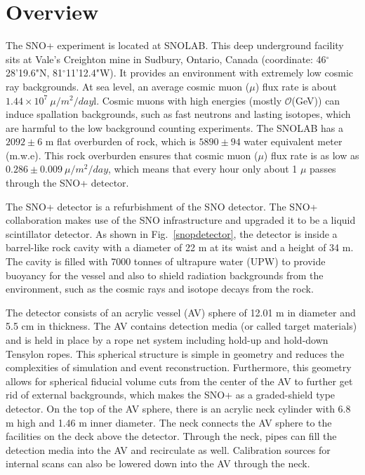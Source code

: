 
\section{Overview}\label{sect:overview}
The SNO+ experiment is located at SNOLAB. This deep underground facility sits at Vale's Creighton mine in Sudbury, Ontario, Canada (coordinate: 46$^\circ$28'19.6"N, 81$^\circ$11'12.4"W). It provides an environment with extremely low cosmic ray backgrounds. At sea level, an average cosmic muon ($\mu$) flux rate is about $1.44\times 10^7~\mu/m^2/day$l\cite{muonflux}. Cosmic muons with high energies (mostly $\mathcal{O}$(GeV)) can induce spallation backgrounds, such as fast neutrons and lasting isotopes, which are harmful to the low background counting experiments\cite{beacom2017physics}. The SNOLAB has a $2092\pm6$ m flat overburden of rock, which is $5890\pm94$ water equivalent meter (m.w.e). This rock overburden ensures that cosmic muon ($\mu$) flux rate is as low as $0.286\pm0.009~\mu/m^2/day$\cite{snop_jinst}, which means that every hour only about 1 $\mu$ passes through the SNO+ detector. 

The SNO+ detector is a refurbishment of the SNO detector. The SNO+ collaboration makes use of the SNO infrastructure and upgraded it to be a liquid scintillator detector. As shown in Fig.~\ref{snopdetector}, the detector is inside a barrel-like rock cavity with a diameter of 22 m at its waist and a height of 34 m. The cavity is filled with 7000 tonnes of ultrapure water (UPW) to provide buoyancy for the vessel and also to shield radiation backgrounds from the environment, such as the cosmic rays and isotope decays from the rock. 

The detector consists of an acrylic vessel (AV) sphere of 12.01 m in diameter and 5.5 cm in thickness. The AV contains detection media (or called target materials) and is held in place by a rope net system including hold-up and hold-down Tensylon ropes. This spherical structure is simple in geometry and reduces the complexities of simulation and event reconstruction. Furthermore, this geometry allows for spherical fiducial volume cuts from the center of the AV to further get rid of external backgrounds, which makes the SNO+ as a graded-shield type detector\cite{waterfield2017optical}.
On the top of the AV sphere, there is an acrylic neck cylinder with 6.8 m high and 1.46 m inner diameter. The neck connects the AV sphere to the facilities on the deck above the detector. Through the neck, pipes can fill the detection media into the AV and recirculate as well. Calibration sources for internal scans can also be lowered down into the AV through the neck.

